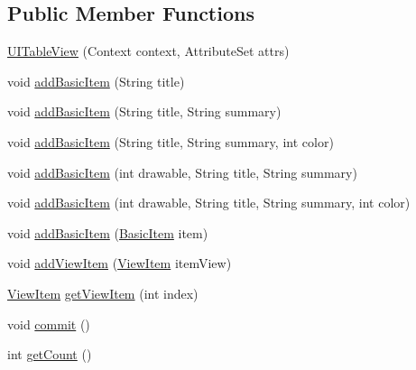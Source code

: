 \subsection*{Public Member Functions}
\begin{DoxyCompactItemize}
\item 
\hyperlink{classcom_1_1zia_1_1freshdocs_1_1widget_1_1_u_i_table_view_ac4a11ce9a35cd4d081e5670b4b8ab778}{U\-I\-Table\-View} (Context context, Attribute\-Set attrs)
\item 
void \hyperlink{classcom_1_1zia_1_1freshdocs_1_1widget_1_1_u_i_table_view_aa626d30b689863592d2098f8e2830744}{add\-Basic\-Item} (String title)
\item 
void \hyperlink{classcom_1_1zia_1_1freshdocs_1_1widget_1_1_u_i_table_view_a1cbb7d8c96526cbe51a892f12fb68daa}{add\-Basic\-Item} (String title, String summary)
\item 
void \hyperlink{classcom_1_1zia_1_1freshdocs_1_1widget_1_1_u_i_table_view_a9752c57d795e3057e0d8284558214c45}{add\-Basic\-Item} (String title, String summary, int color)
\item 
void \hyperlink{classcom_1_1zia_1_1freshdocs_1_1widget_1_1_u_i_table_view_a507538fcbda7edbc45d30e0722f7784e}{add\-Basic\-Item} (int drawable, String title, String summary)
\item 
void \hyperlink{classcom_1_1zia_1_1freshdocs_1_1widget_1_1_u_i_table_view_a4e47672dba20013f573d9d1a221ab6d4}{add\-Basic\-Item} (int drawable, String title, String summary, int color)
\item 
void \hyperlink{classcom_1_1zia_1_1freshdocs_1_1widget_1_1_u_i_table_view_a9e1988cce90bd564a5a4ba97d59c32b6}{add\-Basic\-Item} (\hyperlink{classcom_1_1zia_1_1freshdocs_1_1model_1_1_basic_item}{Basic\-Item} item)
\item 
void \hyperlink{classcom_1_1zia_1_1freshdocs_1_1widget_1_1_u_i_table_view_a74ceb255bf961c9476b3075449ee888c}{add\-View\-Item} (\hyperlink{classcom_1_1zia_1_1freshdocs_1_1model_1_1_view_item}{View\-Item} item\-View)
\item 
\hyperlink{classcom_1_1zia_1_1freshdocs_1_1model_1_1_view_item}{View\-Item} \hyperlink{classcom_1_1zia_1_1freshdocs_1_1widget_1_1_u_i_table_view_a95456f89437d4d2977c85284ce8dea5c}{get\-View\-Item} (int index)
\item 
void \hyperlink{classcom_1_1zia_1_1freshdocs_1_1widget_1_1_u_i_table_view_a83bacf581620fa1eefa41ae286d23a16}{commit} ()
\item 
int \hyperlink{classcom_1_1zia_1_1freshdocs_1_1widget_1_1_u_i_table_view_a0deb3f076806fd9d7e98c144bbffb4b8}{get\-Count} ()

\end{DoxyCompactItemize}
